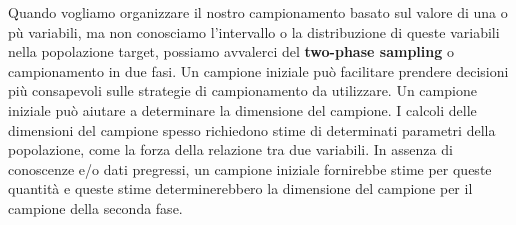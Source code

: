 \documentclass[a4paper]{extarticle}
\begin{document}
Quando vogliamo organizzare il nostro campionamento basato sul valore di una o pù variabili, ma non conosciamo l'intervallo o la distribuzione di queste variabili nella popolazione target, possiamo avvalerci del \textbf{two-phase sampling} o campionamento in due fasi. Un campione iniziale può facilitare prendere decisioni più consapevoli sulle strategie di campionamento da utilizzare.
Un campione iniziale può aiutare a determinare la dimensione del campione. I calcoli delle dimensioni del campione spesso richiedono stime di determinati parametri della popolazione, come la forza della relazione tra due variabili. In assenza di conoscenze e/o dati pregressi, un campione iniziale fornirebbe stime per queste quantità e queste stime determinerebbero la dimensione del campione per il campione della seconda fase.
\end{document}

